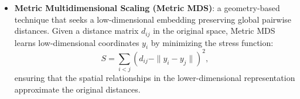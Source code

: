\documentclass[prl,twocolumn]{revtex4-1}
\begin{document}
\begin{itemize}
    \item \textbf{Metric Multidimensional Scaling (Metric MDS)}:
    a geometry-based technique that seeks a low-dimensional embedding preserving global pairwise distances.
    Given a distance matrix $d_{ij}$ in the original space, Metric MDS learns low-dimensional coordinates $y_i$ by minimizing the stress function:
    \begin{equation}
        S = \sum_{i<j} \left( d_{ij} - \|y_i - y_j\| \right)^2,
    \end{equation}
    ensuring that the spatial relationships in the lower-dimensional representation approximate the original distances.

    
\end{itemize}

    
\end{document}
